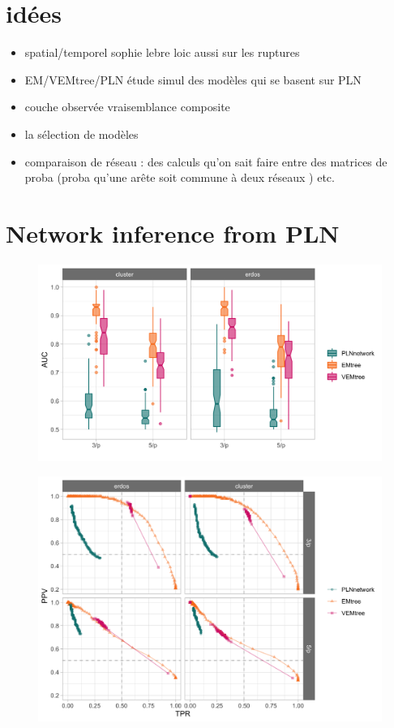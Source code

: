 \section{idées}
\begin{itemize}
\item spatial/temporel sophie lebre loic aussi sur les ruptures
\item EM/VEMtree/PLN étude simul des modèles qui se basent sur PLN
\item couche observée vraisemblance composite
\item la sélection de modèles
\item comparaison de réseau : des calculs qu'on sait faire entre des matrices de proba (proba qu'une arête soit commune à deux réseaux ) etc.
\end{itemize} 

\section{Network inference from PLN}

\begin{figure}
\centering
\includegraphics[width=12cm]{figs/AUC_PLN_EM_VEM.png}
\end{figure}
\begin{figure}
\centering
\includegraphics[width=12cm]{figs/precrec_PLN_EM_VEM.png}
\end{figure}